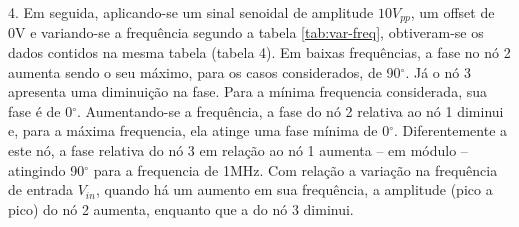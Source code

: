 \documentclass[a4paper]{article} %
\begin{document}
4. Em seguida, aplicando-se um sinal senoidal de amplitude  $10V_{pp}$, um offset de 0V e variando-se a frequência segundo a tabela \ref{tab:var-freq}, obtiveram-se os dados contidos na mesma tabela (tabela 4). Em baixas frequências,  a fase no nó 2 aumenta sendo o seu máximo, para os casos considerados, de 90$^{\circ}$. Já o nó 3 apresenta uma diminuição na fase. Para a mínima frequencia considerada, sua fase é de 0$^{\circ}$.  Aumentando-se a frequência, a fase do nó 2 relativa ao nó 1 diminui e, para a máxima frequencia, ela atinge uma fase mínima de 0$^{\circ}$. Diferentemente a este nó, a fase relativa do nó 3 em relação ao nó 1 aumenta – em módulo – atingindo 90$^{\circ}$ para  a frequencia de 1MHz.
                Com relação a variação na frequência de entrada $V_{in}$, quando há um aumento em sua frequência, a amplitude (pico a pico) do nó 2 aumenta,  enquanto que a do nó 3 diminui.  




\end{document}

